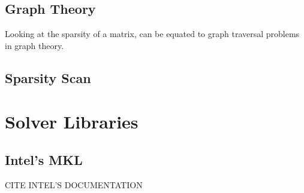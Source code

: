 \subsection{Graph Theory}

Looking at the sparsity of a matrix, can be equated to graph traversal problems in graph theory.

\subsection{Sparsity Scan}

\section{Solver Libraries}

\subsection{Intel's MKL}

CITE INTEL'S DOCUMENTATION